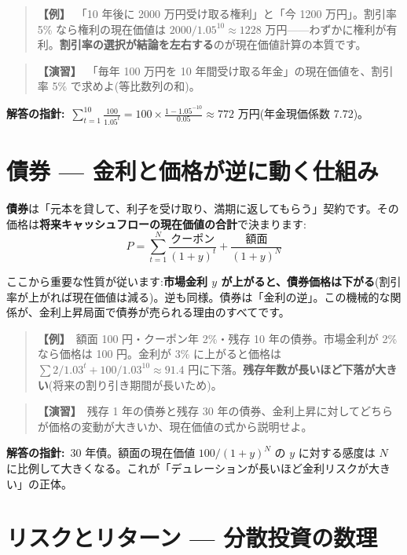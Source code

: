 \documentclass{article}
\begin{document}
\begin{quote}
\textbf{【例】}\ 「10 年後に 2000 万円受け取る権利」と「今 1200 万円」。割引率 5\% なら権利の現在価値は \(2000/1.05^{10} \approx 1228\) 万円——わずかに権利が有利。\textbf{割引率の選択が結論を左右する}のが現在価値計算の本質です。
\end{quote}

\begin{quote}
\textbf{【演習】}\ 「毎年 100 万円を 10 年間受け取る年金」の現在価値を、割引率 5\% で求めよ(等比数列の和)。
\end{quote}

\textbf{解答の指針:}\ \(\sum_{t=1}^{10} \frac{100}{1.05^t} = 100 \times \frac{1 - 1.05^{-10}}{0.05} \approx 772\) 万円(年金現価係数 7.72)。

\section{債券 — 金利と価格が逆に動く仕組み}

\textbf{債券}は「元本を貸して、利子を受け取り、満期に返してもらう」契約です。その価格は\textbf{将来キャッシュフローの現在価値の合計}で決まります:
\[ P = \sum_{t=1}^{N} \frac{\text{クーポン}}{(1+y)^t} + \frac{\text{額面}}{(1+y)^N} \]

ここから重要な性質が従います:\textbf{市場金利 \(y\) が上がると、債券価格は下がる}(割引率が上がれば現在価値は減る)。逆も同様。債券は「金利の逆」。この機械的な関係が、金利上昇局面で債券が売られる理由のすべてです。

\begin{quote}
\textbf{【例】}\ 額面 100 円・クーポン年 2\%・残存 10 年の債券。市場金利が 2\% なら価格は 100 円。金利が 3\% に上がると価格は \(\sum 2/1.03^t + 100/1.03^{10} \approx 91.4\) 円に下落。\textbf{残存年数が長いほど下落が大きい}(将来の割り引き期間が長いため)。
\end{quote}

\begin{quote}
\textbf{【演習】}\ 残存 1 年の債券と残存 30 年の債券、金利上昇に対してどちらが価格の変動が大きいか、現在価値の式から説明せよ。
\end{quote}

\textbf{解答の指針:}\ 30 年債。額面の現在価値 \(100/(1+y)^N\) の \(y\) に対する感度は \(N\) に比例して大きくなる。これが「デュレーションが長いほど金利リスクが大きい」の正体。

\section{リスクとリターン — 分散投資の数理}
\end{document}
